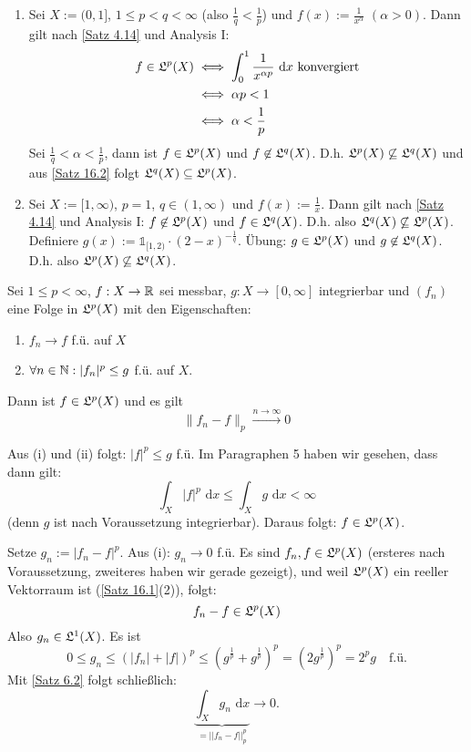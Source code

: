 \documentclass[a4paper,twoside,DIV15,BCOR12mm,chapterprefix=true,headings=onelinechapter]{scrbook}
\begin{document}
\begin {beispiel}
\begin{enumerate}
\item Sei $X:=(0,1]$, $1\le p<q<\infty$ (also $\frac 1q<\frac1p$) und $f(x):=\frac 1{x^\alpha}$ $(\alpha>0)$. Dann gilt nach 
\ref{Satz 4.14} und Analysis I:
\begin{align*}
f\in\mathfrak{L}^p(X)&\iff\int_0^1\frac1{x^{\alpha p}}\text{ d}x \text{ konvergiert}\\
&\iff\alpha p<1\\
&\iff \alpha<\frac 1p
\end{align*}
Sei $\frac 1q<\alpha<\frac 1p$, dann ist $f\in\mathfrak{L}^p(X)$ und $f\not\in\mathfrak{L}^q(X)$. D.h. $\mathfrak{L}^p(X)\not\subseteq\mathfrak{L}^q(X)$ und aus \ref{Satz 16.2} folgt $\mathfrak{L}^q(X)\subseteq\mathfrak{L}^p(X)$.
\item Sei $X:=[1,\infty)$, $p=1$, $q\in(1,\infty)$ und $f(x):=\frac 1x$. Dann gilt nach \ref{Satz 4.14} und Analysis I: $f\not\in\mathfrak{L}^p(X)$ und $f\in\mathfrak{L}^q(X)$. D.h. also $\mathfrak{L}^q(X)\not\subseteq\mathfrak{L}^p(X)$.\\
Definiere $g(x):=\mathds{1}_{[1,2)}\cdot (2-x)^{-\frac 1q}$. Übung: $g\in\mathfrak{L}^p(X)$ und $g\not\in\mathfrak{L}^q(X)$. D.h. also $\mathfrak{L}^p(X)\not\subseteq\mathfrak{L}^q(X)$.
\end{enumerate}
\end{beispiel}

\begin{satz}
\label{Satz 16.3}
Sei $1\le p<\infty$, $f:X\to\mathbb{R}$ sei messbar, $g:X\to[0,\infty]$ integrierbar und $(f_n)$ eine Folge in $\mathfrak{L}^p(X)$ mit den Eigenschaften:
\begin{enumerate}
\item $f_n\to f$ f.ü. auf $X$
\item $\forall n\in\mathbb{N}: |f_n|^p\le g$ f.ü. auf $X$.
\end{enumerate}
Dann ist $f\in\mathfrak{L}^p(X)$ und es gilt
\[\|f_n-f\|_p\stackrel{n\to\infty}\to 0\]
\end{satz}

\begin{beweis}
Aus (i) und (ii) folgt: $|f|^p \leq g$ f.\"u.
Im Paragraphen 5 haben wir gesehen, dass dann gilt:
\[ \int_X |f|^p \text{ d}x \leq \int_X g \text{ d}x < \infty \]
(denn $g$ ist nach Voraussetzung integrierbar). 
Daraus folgt: $f \in \mathfrak{L}^p(X)$.

Setze $g_n := |f_n - f|^p$. Aus (i): $g_n \to 0$ f.\"u. Es sind $f_n, f \in \mathfrak{L}^p(X)$ (ersteres nach Voraussetzung, zweiteres haben wir gerade gezeigt), und weil $\mathfrak{L}^p(X)$ ein reeller Vektorraum ist (\ref{Satz 16.1}(2)), folgt:
\[ f_n - f \in \mathfrak{L}^p(X) \]
Also $g_n \in \mathfrak{L}^1(X)$.
Es ist 
\[ 0 \leq g_n \leq \left( |f_n| + |f| \right)^p \leq \left( g^{\frac{1}{p}} + g^{\frac{1}{p}} \right)^p = \left( 2g^{\frac{1}{p}} \right)^p = 2^p g \quad\text{f.\"u.} \]
Mit \ref{Satz 6.2} folgt schließlich:
\[ \underbrace{\int_X g_n \text{ d}x}_{=||f_n - f||_p^p} \to 0. \]
\end{beweis}
\end{document}
